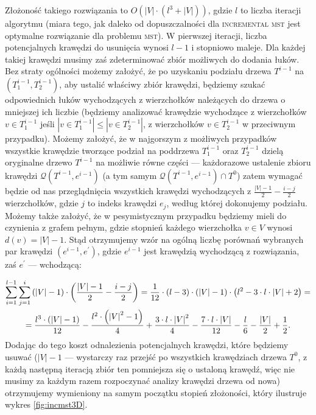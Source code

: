 Złożoność takiego rozwiązania to $O \left( \left| V \right| \cdot \left(l^{3} + \left| V \right| \right) \right)$, gdzie $l$ to liczba iteracji algorytmu (miara tego, jak daleko od dopuszczalności dla \textsc{incremental mst} jest optymalne rozwiązanie dla problemu \textsc{mst}). W pierwszej iteracji, liczba potencjalnych krawędzi do usunięcia wynosi $l - 1$ i stopniowo maleje. Dla każdej takiej krawędzi musimy zaś zdeterminować zbiór możliwych do dodania łuków. Bez straty ogólności możemy założyć, że po uzyskaniu podziału drzewa $T^{i-1}$ na $\left( T^{i-1}_{1}, T^{i-1}_{2} \right)$, aby ustalić właściwy zbiór krawędzi, będziemy szukać odpowiednich łuków wychodzących z wierzchołków należących do drzewa o mniejszej ich liczbie (będziemy analizować krawędzie wychodzące z wierzchołków $v \in T^{i-1}_{1}$ jeśli $\left| v \in T^{i-1}_{1} \right| \leqslant \left| v \in T^{i-1}_{2} \right|$, z wierzchołków $v \in T^{i-1}_{2}$ w przeciwnym przypadku). Możemy założyć, że w najgorszym z możliwych przypadków wszystkie krawędzie tworzące podział na poddrzewa $T^{i-1}_{1}$ oraz $T^{i-1}_{2}$ dzielą oryginalne drzewo $T^{i-1}$ na możliwie równe części --- każdorazowe ustalenie zbioru krawędzi $\mathcal{Q} \left( T^{i-1}, e^{i-1} \right)$ (a tym samym $\mathcal{Q} \left( T^{i-1}, e^{i-1} \right) \cap T^{0}$) zatem wymagać będzie od nas przeglądnięcia wszystkich krawędzi wychodzących z $\frac{\left| V \right| - 1}{2} - \frac{i - j}{2}$ wierzchołków, gdzie $j$ to indeks krawędzi $e_{j}$, według której dokonujemy podziału. Możemy także założyć, że w pesymistycznym przypadku będziemy mieli do czynienia z grafem pełnym, gdzie stopnień każdego wierzchołka $v \in V$ wynosi $d \left( v \right) = \left| V \right| - 1$. Stąd otrzymujemy wzór na ogólną liczbę porównań wybranych par krawędzi $\left( e^{i-1}, e^{\prime} \right)$, gdzie $e^{i-1}$ jest krawędzią wychodzącą z rozwiązania, zaś $e^{\prime}$ --- wchodzącą:

\begin{gather*}
	\sum_{\mathclap{i=1}}^{\mathclap{l-1}} \sum_{\mathclap{j=1}}^{\mathclap{i}} \left( \left| V \right| - 1 \right) \cdot \left( \frac{\left| V \right| - 1}{2} - \frac{i - j}{2} \right) = \frac{1}{12} \cdot \left( l - 3 \right) \cdot \left( \left| V \right| - 1 \right) \cdot \left( l^{2} - 3 \cdot l \cdot \left| V \right| + 2 \right) = \\ = \frac{l^{3} \cdot \left( \left| V \right| - 1 \right)}{12} - \frac{l^{2} \cdot \left( \left| V \right|^{2} - 1 \right)}{4} + \frac{3 \cdot l \cdot \left| V \right|^{2}}{4} - \frac{7 \cdot l \cdot \left| V \right|}{12} - \frac{l}{6} - \frac{\left| V \right|}{2} + \frac{1}{2}\text{.}
\end{gather*}
Dodając do tego koszt odnalezienia potencjalnych krawędzi, które będziemy usuwać ($\left| V \right| - 1$ --- wystarczy raz przejść po wszystkich krawędziach drzewa $T^{0}$, z każdą następną iteracją zbiór ten pomniejsza się o ustaloną krawędź, więc nie musimy za każdym razem rozpoczynać analizy krawędzi drzewa od nowa) otrzymujemy wymieniony na samym początku stopień złożoności, który ilustruje wykres \ref{fig:incmst3D}.

